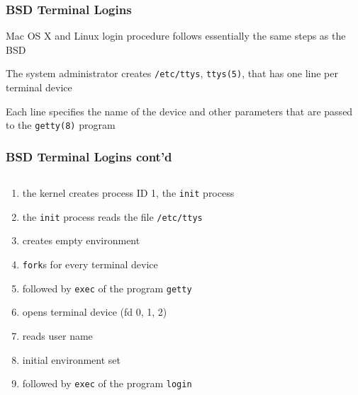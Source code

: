\documentclass[newPxFont,sthlmFooter,nooffset]{beamer}
\begin{document}
\begin{frame}[t]
  \frametitle{BSD Terminal Logins}

Mac OS X and Linux login procedure follows essentially the same steps as the BSD 

The system administrator creates \texttt{/etc/ttys}, \texttt{ttys(5)}, that has one line per terminal device

Each line specifies the name of the device and other parameters that are passed to the \texttt{getty(8)} program
\end{frame}



\begin{frame}[t]
  \frametitle{BSD Terminal Logins cont'd}
  \begin{columns}[t]
    \begin{column}{0.6\linewidth}
      \begin{enumerate}
      \item <1-> the kernel creates process ID 1, the \texttt{init} process
      \item <2-> the \texttt{init} process reads the file \texttt{/etc/ttys}
      \item <2-> creates empty environment
      \item <3-> \texttt{fork}s for every terminal device
      \item <4-> followed by \texttt{exec} of the program \texttt{getty}
      \item <4-> opens terminal device (fd 0, 1, 2)
      \item <4-> reads user name
      \item <4-> initial environment set
      \item <5-> followed by \texttt{exec} of the program \texttt{login}
      \end{enumerate}
    \end{column}
    \begin{column}{0.4\linewidth}
      \begin{figure}[h]\vspace{-3em}
        \centering
\end{figure}
\end{column}
\end{columns}
\end{frame}
\end{document}
